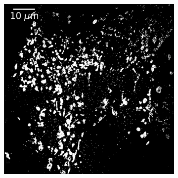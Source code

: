 \begin{figure}[htbp]
\begin{subfigure}{0.49\textwidth}
        \includegraphics[width=\textwidth]{figures/mitochondria_image6_jeffed.png}
        \caption{}
    \end{subfigure}
    

\end{figure}
